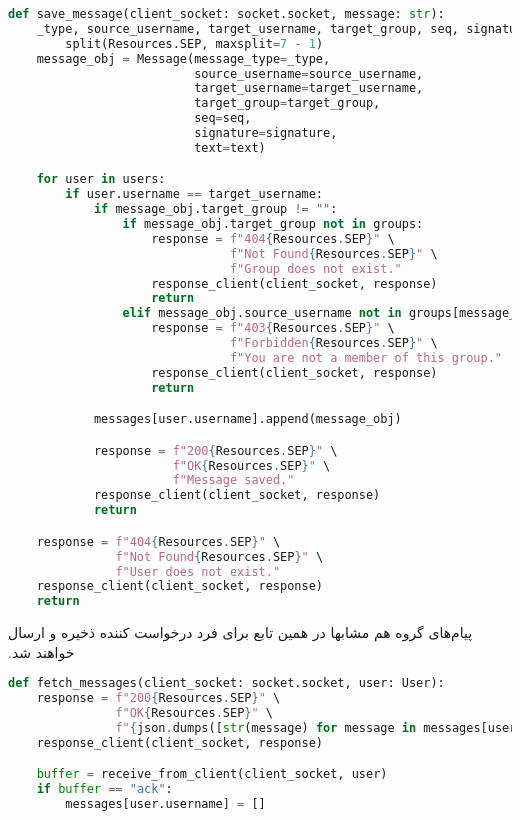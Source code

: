 \begin{latin}
\begin{lstlisting}[firstnumber=181, language=Python]
def save_message(client_socket: socket.socket, message: str):
    _type, source_username, target_username, target_group, seq, signature, text = message. \
        split(Resources.SEP, maxsplit=7 - 1)
    message_obj = Message(message_type=_type,
                          source_username=source_username,
                          target_username=target_username,
                          target_group=target_group,
                          seq=seq,
                          signature=signature,
                          text=text)

    for user in users:
        if user.username == target_username:
            if message_obj.target_group != "":
                if message_obj.target_group not in groups:
                    response = f"404{Resources.SEP}" \
                               f"Not Found{Resources.SEP}" \
                               f"Group does not exist."
                    response_client(client_socket, response)
                    return
                elif message_obj.source_username not in groups[message_obj.target_group].usernames:
                    response = f"403{Resources.SEP}" \
                               f"Forbidden{Resources.SEP}" \
                               f"You are not a member of this group."
                    response_client(client_socket, response)
                    return

            messages[user.username].append(message_obj)

            response = f"200{Resources.SEP}" \
                       f"OK{Resources.SEP}" \
                       f"Message saved."
            response_client(client_socket, response)
            return

    response = f"404{Resources.SEP}" \
               f"Not Found{Resources.SEP}" \
               f"User does not exist."
    response_client(client_socket, response)
    return
\end{lstlisting}
\end{latin}
‫
‫پیام‌های گروه هم مشابها در همین تابع برای فرد درخواست کننده ذخیره و ارسال خواهند شد.

\begin{latin}
\begin{lstlisting}[firstnumber=223, language=Python]
def fetch_messages(client_socket: socket.socket, user: User):
    response = f"200{Resources.SEP}" \
               f"OK{Resources.SEP}" \
               f"{json.dumps([str(message) for message in messages[user.username]])}"
    response_client(client_socket, response)

    buffer = receive_from_client(client_socket, user)
    if buffer == "ack":
        messages[user.username] = []
\end{lstlisting}
\end{latin}


